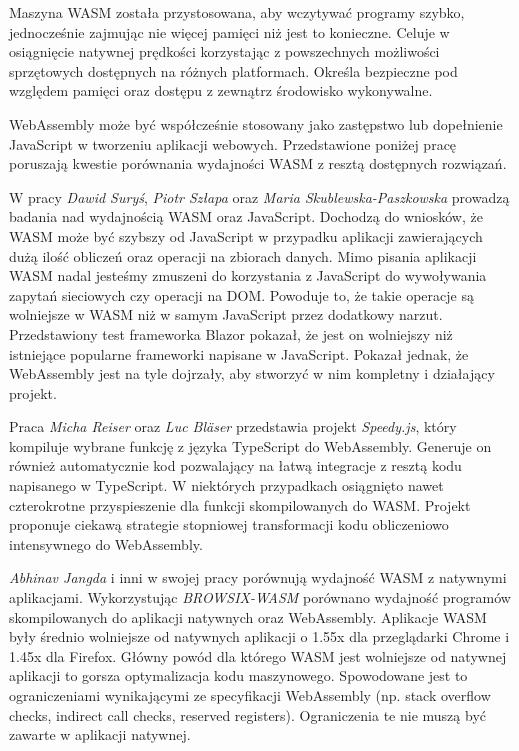 \documentclass[language=polish,type=master]{aghmodern}
\begin{document}
Maszyna WASM została przystosowana, aby wczytywać programy szybko, jednocześnie zajmując nie więcej pamięci niż jest to konieczne.
Celuje w osiągnięcie natywnej prędkości korzystając z powszechnych możliwości sprzętowych dostępnych na różnych platformach.
Określa bezpieczne pod względem pamięci oraz dostępu z zewnątrz środowisko wykonywalne.

WebAssembly może być współcześnie stosowany jako zastępstwo lub dopełnienie JavaScript w tworzeniu aplikacji webowych.
Przedstawione poniżej pracę poruszają kwestie porównania wydajności WASM z resztą dostępnych rozwiązań.

W pracy \cite{wasm_blazor} \emph{Dawid Suryś}, \emph{Piotr Szłapa} oraz \emph{Maria Skublewska-Paszkowska} prowadzą badania nad wydajnością WASM oraz JavaScript.
Dochodzą do wniosków, że WASM może być szybszy od JavaScript w przypadku aplikacji zawierających dużą ilość obliczeń oraz operacji na zbiorach danych.
Mimo pisania aplikacji WASM nadal jesteśmy zmuszeni do korzystania z JavaScript do wywoływania zapytań sieciowych czy operacji na DOM.
Powoduje to, że takie operacje są wolniejsze w WASM niż w samym JavaScript przez dodatkowy narzut.
Przedstawiony test frameworka Blazor\footnotemark{} pokazał, że jest on wolniejszy niż istniejące popularne frameworki napisane w JavaScript.
Pokazał jednak, że WebAssembly jest na tyle dojrzały, aby stworzyć w nim kompletny i działający projekt.

Praca \cite{wasm_speedyjs} \emph{Micha Reiser} oraz \emph{Luc Bl\"{a}ser} przedstawia projekt \emph{Speedy.js}, który kompiluje wybrane funkcję z języka TypeScript\footnotemark{} do WebAssembly.
Generuje on również automatycznie kod pozwalający na łatwą integracje z resztą kodu napisanego w TypeScript.
W niektórych przypadkach osiągnięto nawet czterokrotne przyspieszenie dla funkcji skompilowanych do WASM.
Projekt proponuje ciekawą strategie stopniowej transformacji kodu obliczeniowo intensywnego do WebAssembly.

\emph{Abhinav Jangda} i inni w swojej pracy \cite{wasm_native} porównują wydajność WASM z natywnymi aplikacjami.
Wykorzystując \emph{BROWSIX-WASM}\footnotemark{} porównano wydajność programów skompilowanych do aplikacji natywnych oraz WebAssembly.
Aplikacje WASM były średnio wolniejsze od natywnych aplikacji o 1.55x dla przeglądarki Chrome i 1.45x dla Firefox.
Główny powód dla którego WASM jest wolniejsze od natywnej aplikacji to gorsza optymalizacja kodu maszynowego.
Spowodowane jest to ograniczeniami wynikającymi ze specyfikacji WebAssembly (np. stack overflow checks, indirect call checks, reserved registers).
Ograniczenia te nie muszą być zawarte w aplikacji natywnej.
\end{document}
